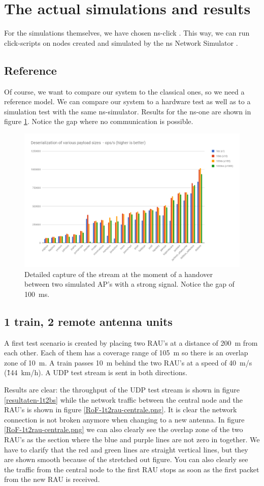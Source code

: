 \documentclass[twocolumn]{phdsymp} %
\begin{document}
\section{The actual simulations and results}
For the simulations themselves, we have chosen ns-click \cite{ns-click}.  This way, we can run click-scripts \cite{click} on nodes created and simulated by the ns {N}etwork {S}imulator \cite{ns}.

\subsection{Reference}
Of course, we want to compare our system to the classical ones, so we need a reference model.  We can compare our system to a hardware test as well as to a simulation test with the same ns-simulator.  Results for the ns-one are shown in figure \ref{2AP}.  Notice the gap where no communication is possible.

\begin{figure}[ht]
\begin{center}
	\includegraphics[width=.40\textwidth]{images/jsondeserialization.png}
	\caption{\label{2AP}Detailed capture of the stream at the moment of a handover between two simulated AP's with a strong signal.  Notice the gap of 100~ms.}
\end{center}
\end{figure}


\subsection{1 train, 2 remote antenna units}
A first test scenario is created by placing two RAU's at a distance of 200~m from each other.  Each of them has a coverage range of 105~m so there is an overlap zone of 10~m.  A train passes 10~m behind the two RAU's at a speed of 40~m/s (\~144~km/h).  A UDP test stream is sent in both directions.

Results are clear: the throughput of the UDP test stream is shown in figure \ref{resultaten-1t2bs} while the network traffic between the central node and the RAU's is shown in figure \ref{RoF-1t2rau-centrale.png}.  It is clear the network connection is not broken anymore when changing to a new antenna.  In figure \ref{RoF-1t2rau-centrale.png} we can also clearly see the overlap zone of the two RAU's as the section where the blue and purple lines are not zero in together.  We have to clarify that the red and green lines are straight vertical lines, but they are shown smooth because of the stretched out figure.  You can also clearly see the traffic from the central node to the first RAU stops as soon as the first packet from the new RAU is received.
\end{document}

